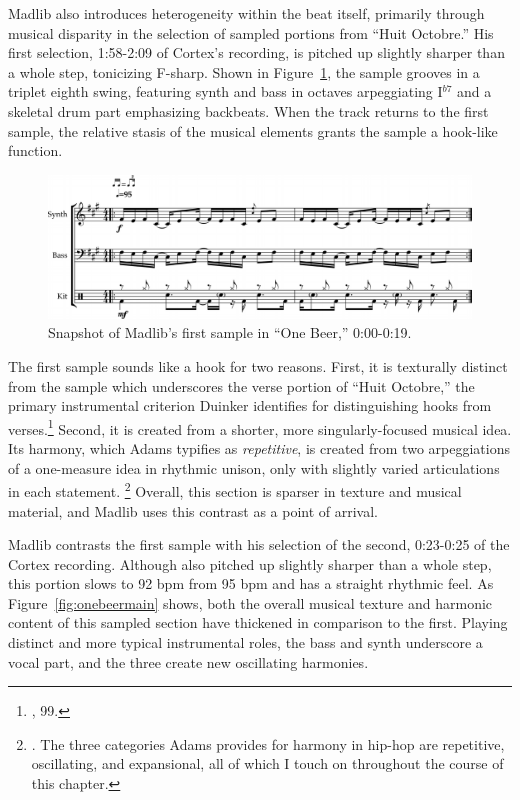 Madlib also introduces heterogeneity within the beat itself, primarily through musical disparity in 
the selection of sampled portions from ``Huit Octobre.'' His first selection, 1:58-2:09 of Cortex's
recording, is pitched up slightly sharper than a whole step, tonicizing F-sharp. Shown in
Figure~\ref{fig:onebeerintro}, the sample grooves in a triplet eighth swing, featuring synth and bass 
in octaves arpeggiating I$^{b7}$ and a skeletal drum part emphasizing backbeats. When the track returns 
to the first sample, the relative stasis of the musical elements grants the sample a hook-like function.

    \begin{figure}[ht]
        \centering
        \includegraphics[width=\textwidth]{images/figures/chp 02/000019onebeerintro.pdf}
        \caption{Snapshot of Madlib's first sample in ``One Beer,'' 0:00-0:19.}
        \label{fig:onebeerintro}
    \end{figure}

The first sample sounds like a hook for two reasons. First, it is texturally distinct from the sample 
which underscores the verse portion of ``Huit Octobre,'' the primary instrumental criterion Duinker
identifies for distinguishing hooks from verses.\footnote{\cite{benduinkerSongFormMainstreaming2020}, 99.}
Second, it is created from a shorter, more singularly-focused musical idea. Its harmony, which Adams 
typifies as \emph{repetitive}, is created from two arpeggiations of a one-measure idea in rhythmic unison,
only with slightly varied articulations in each statement.
\footnote{\cite{kyleadamsHarmonicSyntacticMotivic2020}. The three categories Adams provides for 
harmony in hip-hop are repetitive, oscillating, and expansional, all of which I touch on throughout
the course of this chapter.} Overall, this section is sparser in texture and musical material, and 
Madlib uses this contrast as a point of arrival.

Madlib contrasts the first sample with his selection of the second, 0:23-0:25 of the Cortex recording.
Although also pitched up slightly sharper than a whole step, this portion slows to 92 bpm from 95 bpm 
and has a straight rhythmic feel. As Figure~\ref{fig:onebeermain} shows, both the overall musical texture
and harmonic content of this sampled section have thickened in comparison to the first. Playing distinct 
and more typical instrumental roles, the bass and synth underscore a vocal part, and the three create new
oscillating harmonies.

